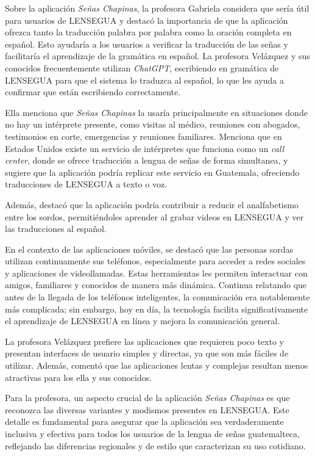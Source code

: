 Sobre la aplicación \textit{Señas Chapinas}, la profesora Gabriela considera que sería útil para usuarios de LENSEGUA y destacó la importancia de que la aplicación ofrezca tanto la traducción palabra por palabra como la oración completa en español. Esto ayudaría a los usuarios a verificar la traducción de las señas y facilitaría el aprendizaje de la gramática en español. La profesora Velázquez y sus conocidos frecuentemente utilizan \textit{ChatGPT}, escribiendo en gramática de LENSEGUA para que el sistema lo traduzca al español, lo que les ayuda a confirmar que están escribiendo correctamente.

Ella menciona que \textit{Señas Chapinas} la usaría principalmente en situaciones donde no hay un intérprete presente, como visitas al médico, reuniones con abogados, testimonios en corte, emergencias y reuniones familiares. Menciona que en Estados Unidos existe un servicio de intérpretes que funciona como un \textit{call center}, donde se ofrece traducción a lengua de señas de forma simultanea, y sugiere que la aplicación podría replicar este servicio en Guatemala, ofreciendo traducciones de LENSEGUA a texto o voz.

Además, destacó que la aplicación podría contribuir a reducir el analfabetismo entre los sordos, permitiéndoles aprender al grabar videos en LENSEGUA y ver las traducciones al español. 

En el contexto de las aplicaciones móviles, se destacó que las personas sordas utilizan continuamente sus teléfonos, especialmente para acceder a redes sociales y aplicaciones de videollamadas. Estas herramientas les permiten interactuar con amigos, familiares y conocidos de manera más dinámica. Continua relatando que antes de la llegada de los teléfonos inteligentes, la comunicación era notablemente más complicada; sin embargo, hoy en día, la tecnología facilita significativamente el aprendizaje de LENSEGUA en línea y mejora la comunicación general. 

La profesora Velázquez prefiere las aplicaciones que requieren poco texto y presentan interfaces de usuario simples y directas, ya que son más fáciles de utilizar. Además, comentó que las aplicaciones lentas y complejas resultan menos atractivas para los ella y sus conocidos.

Para la profesora, un aspecto crucial de la aplicación \textit{Señas Chapinas} es que reconozca las diversas variantes y modismos presentes en LENSEGUA. Este detalle es fundamental para asegurar que la aplicación sea verdaderamente inclusiva y efectiva para todos los usuarios de la lengua de señas guatemalteca, reflejando las diferencias regionales y de estilo que caracterizan su uso cotidiano.

